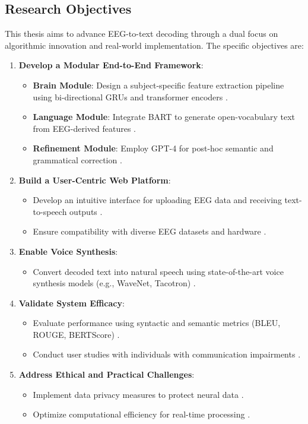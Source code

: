 \documentclass[journal]{IEEEtran}
\begin{document}
\subsection{Research Objectives}
This thesis aims to advance EEG-to-text decoding through a dual focus on algorithmic innovation and real-world implementation. The specific objectives are:
\begin{enumerate}[label=(\arabic*)]
	\item \textbf{Develop a Modular End-to-End Framework}:
	      \begin{itemize}
	      	\item \textbf{Brain Module}: Design a subject-specific feature extraction pipeline using bi-directional GRUs and transformer encoders \cite{Vaswani2017}.
	      	\item \textbf{Language Module}: Integrate BART to generate open-vocabulary text from EEG-derived features \cite{Lewis2019}.
	      	\item \textbf{Refinement Module}: Employ GPT-4 for post-hoc semantic and grammatical correction \cite{OpenAI2023}.
	      \end{itemize}
	\item \textbf{Build a User-Centric Web Platform}:
	      \begin{itemize}
	      	\item Develop an intuitive interface for uploading EEG data and receiving text-to-speech outputs \cite{Nieto2022}.
	      	\item Ensure compatibility with diverse EEG datasets and hardware \cite{Hollenstein2018}.
	      \end{itemize}
	\item \textbf{Enable Voice Synthesis}:
	      \begin{itemize}
	      	\item Convert decoded text into natural speech using state-of-the-art voice synthesis models (e.g., WaveNet, Tacotron) \cite{Moses2021}.
	      \end{itemize}
	\item \textbf{Validate System Efficacy}:
	      \begin{itemize}
	      	\item Evaluate performance using syntactic and semantic metrics (BLEU, ROUGE, BERTScore) \cite{Lin2004, Zhang2019}.
	      	\item Conduct user studies with individuals with communication impairments \cite{Willett2023}.
	      \end{itemize}
	\item \textbf{Address Ethical and Practical Challenges}:
	      \begin{itemize}
	      	\item Implement data privacy measures to protect neural data \cite{Pandarinath2017}.
	      	\item Optimize computational efficiency for real-time processing \cite{Duan2023}.
	      \end{itemize}
\end{enumerate}
\end{document}
